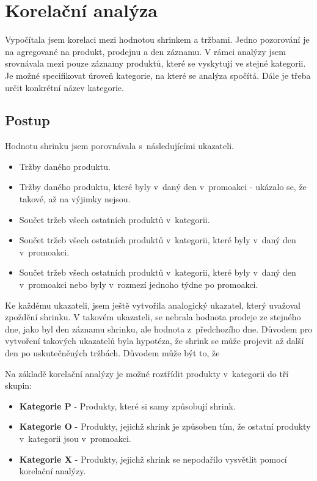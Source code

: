 \newpage
\chapter{Korelační analýza}

Vypočítala jsem korelaci mezi hodnotou shrinkem a tržbami. Jedno pozorování je na agregované na produkt, prodejnu a den záznamu. 
V rámci analýzy jsem srovnávala mezi pouze záznamy produktů, které se vyskytují ve stejné kategorii. Je možné specifikovat úroveň kategorie, na které se analýza spočítá. Dále je třeba určit konkrétní název kategorie.



\section{Postup}

Hodnotu shrinku jsem porovnávala s~následujícími ukazateli. 
\begin{itemize}
    \itemsep0em 

    \item Tržby daného produktu.
    \item Tržby daného produktu, které byly v~daný den v~promoakci - ukázalo se, že takové, až na výjimky nejsou.
    \item Součet tržeb všech ostatních produktů v~kategorii.
    \item Součet tržeb všech ostatních produktů v~kategorii, které byly v~daný den v~promoakci.
    \item Součet tržeb všech ostatních produktů v~kategorii, které byly v~daný den v~promoakci nebo byly v~rozmezí jednoho týdne po promoakci.
\end{itemize}

Ke každému ukazateli, jsem ještě vytvořila analogický ukazatel, který uvažoval zpoždění shrinku. V takovém ukazateli, se nebrala hodnota prodeje ze stejného dne, jako byl den záznamu shrinku, ale hodnota z~předchozího dne. Důvodem pro vytvoření takových ukazatelů byla hypotéza, že shrink se může projevit až další den po uskutečněných tržbách. Důvodem může být to, že 

Na základě korelační analýzy je možné roztřídit produkty v~kategorii do tří skupin:
\begin{itemize}
    \itemsep0em 
    \item[] \textbf{Kategorie P} - Produkty, které si samy způsobují shrink.
    \item[] \textbf{Kategorie O} - Produkty, jejichž shrink je způsoben tím, že ostatní produkty v~kategorii jsou v~promoakci.
    \item[] \textbf{Kategorie X} - Produkty, jejichž shrink se nepodařilo vysvětlit pomocí korelační analýzy.
\end{itemize}

